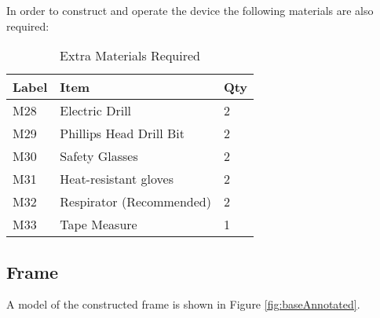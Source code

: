 \documentclass[11pt,english]{article}
\begin{document}
\newpage
\noindent In order to construct and operate the device the following materials are also required:
\begin {table}[ht!]\label{table:extraitems} \caption{Extra Materials Required}\begin{center} \begin{tabular}{ | l| l |l|} \hline \textbf{Label} &\textbf{Item} & \textbf{Qty} \\ \hline 
M28  &  Electric Drill & 2\\ \hline 
M29 & Phillips Head Drill Bit & 2 \\ \hline
M30 & Safety Glasses & 2 \\ \hline
M31 & Heat-resistant gloves & 2 \\ \hline
M32 & Respirator (Recommended) & 2\\ \hline
M33 & Tape Measure & 1\\ \hline
\end{tabular} \end{center}
\end{table}
\newpage
\subsection{Frame}

\noindent A model of the constructed frame is shown in Figure \ref{fig:baseAnnotated}.
\end{document}
